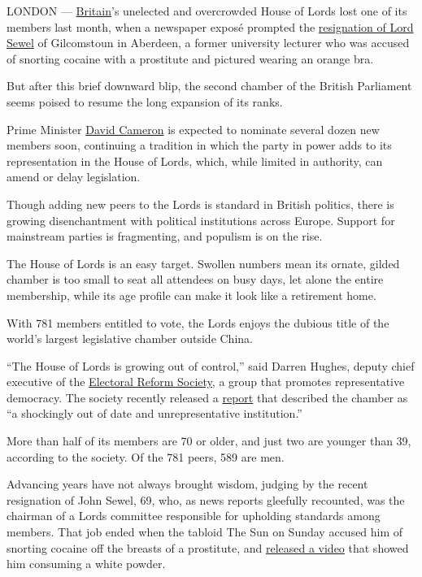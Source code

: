 LONDON ---
\href{http://topics.nytimes.com/top/news/international/countriesandterritories/unitedkingdom/index.html?inline=nyt-geo}{Britain}'s
unelected and overcrowded House of Lords lost one of its members last
month, when a newspaper exposé prompted the
\href{http://www.nytimes.com/2015/07/27/world/europe/british-house-of-lords-john-sewel-resigns-posts-drug-allegations.html}{resignation
of Lord Sewel} of Gilcomstoun in Aberdeen, a former university lecturer
who was accused of snorting cocaine with a prostitute and pictured
wearing an orange bra.

But after this brief downward blip, the second chamber of the British
Parliament seems poised to resume the long expansion of its ranks.

Prime Minister
\href{http://topics.nytimes.com/top/reference/timestopics/people/c/david_cameron/index.html?inline=nyt-per}{David
Cameron} is expected to nominate several dozen new members soon,
continuing a tradition in which the party in power adds to its
representation in the House of Lords, which, while limited in authority,
can amend or delay legislation.

Though adding new peers to the Lords is standard in British politics,
there is growing disenchantment with political institutions across
Europe. Support for mainstream parties is fragmenting, and populism is
on the rise.

The House of Lords is an easy target. Swollen numbers mean its ornate,
gilded chamber is too small to seat all attendees on busy days, let
alone the entire membership, while its age profile can make it look like
a retirement home.

With 781 members entitled to vote, the Lords enjoys the dubious title of
the world's largest legislative chamber outside China.

``The House of Lords is growing out of control,'' said Darren Hughes,
deputy chief executive of the
\href{http://www.electoral-reform.org.uk/}{Electoral Reform Society,} a
group that promotes representative democracy. The society recently
released a
\href{http://www.electoral-reform.org.uk/blog/its-official-house-lords-completely-bust\#sthash.V2bgg4l6.dpuf}{report}
that described the chamber as ``a shockingly out of date and
unrepresentative institution.''

More than half of its members are 70 or older, and just two are younger
than 39, according to the society. Of the 781 peers, 589 are men.

Advancing years have not always brought wisdom, judging by the recent
resignation of John Sewel, 69, who, as news reports gleefully recounted,
was the chairman of a Lords committee responsible for upholding
standards among members. That job ended when the tabloid The Sun on
Sunday accused him of snorting cocaine off the breasts of a prostitute,
and
\href{http://www.thesun.co.uk/sol/homepage/news/6560352/Baron-John-Sewel-drug-binges-with-prostitutes.html}{released
a video} that showed him consuming a white powder.

